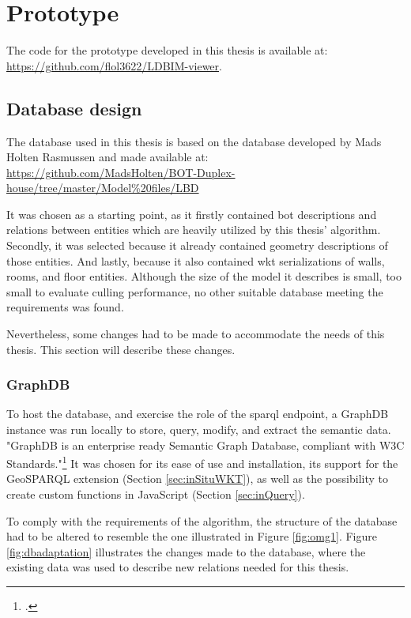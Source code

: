 \chapter{Prototype} \label{ch:prototype}
The code for the prototype developed in this thesis is available at:\\
\url{https://github.com/flol3622/LDBIM-viewer}.

\section{Database design}
The database used in this thesis is based on the database developed by Mads Holten Rasmussen and made available at:\\
\url{https://github.com/MadsHolten/BOT-Duplex-house/tree/master/Model%20files/LBD}

It was chosen as a starting point, as it firstly contained \ac{bot} descriptions and relations between entities which are heavily utilized by this thesis' algorithm. Secondly, it was selected because it already contained geometry descriptions of those entities. And lastly, because it also contained \ac{wkt} serializations of walls, rooms, and floor entities. Although the size of the model it describes is small, too small to evaluate culling performance, no other suitable database meeting the requirements was found.

Nevertheless, some changes had to be made to accommodate the needs of this thesis. This section will describe these changes.

\subsection{GraphDB}
To host the database, and exercise the role of the \ac{sparql} endpoint, a GraphDB instance was run locally to store, query, modify, and extract the semantic data. "GraphDB is an enterprise ready Semantic Graph Database, compliant with W3C Standards."\footcite{graphdb} It was chosen for its ease of use and installation, its support for the GeoSPARQL extension (Section \ref{sec:inSituWKT}), as well as the possibility to create custom functions in JavaScript (Section \ref{sec:inQuery}).

To comply with the requirements of the algorithm, the structure of the database had to be altered to resemble the one illustrated in Figure \ref{fig:omg1}. Figure \ref{fig:dbadaptation} illustrates the changes made to the database, where the existing data was used to describe new relations needed for this thesis.

